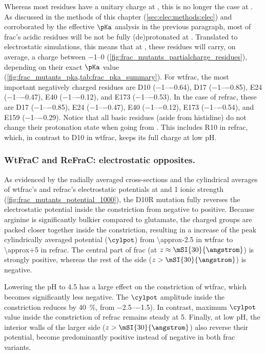 Whereas most residues have a unitary charge at , this is no longer the case at . As discussed
in the methods of this chapter (\cref{sec:elec:methods:elec}) and corroborated by the effective $\pKa$
analysis in the previous paragraph, most of \gls{frac}'s acidic residues will be not be fully (de)protonated
at . Translated to electrostatic simulations, this means that at , these residues will carry,
on average, a charge between \SIrange{-1}{0}{\ec} (\cref{fig:frac_mutants_partialcharge_residues}), depending
on their exact $\pKa$ value (\cref{fig:frac_mutants_pka,tab:frac_pka_summary}). For \gls{wtfrac}, the most
important negatively charged residues are D10 (\SIrange{-1}{-0.64}{\ec}), D17 (\SIrange{-1}{-0.85}{\ec}), E24
(\SIrange{-1}{-0.47}{\ec}), E40 (\SIrange{-1}{-0.12}{\ec}), and E173 (\SIrange{-1}{-0.53}{\ec}). In the case
of \gls{refrac}, these are D17 (\SIrange{-1}{-0.85}{\ec}), E24 (\SIrange{-1}{-0.47}{\ec}), E40
(\SIrange{-1}{-0.12}{\ec}), E173 (\SIrange{-1}{-0.54}{\ec}), and E159 (\SIrange{-1}{-0.29}{\ec}). Notice that
all basic residues (aside from histidine) do not change their protonation state when going from
. This includes R10 in \gls{refrac}, which, in contrast to D10 in \gls{wtfrac}, keeps its
full charge at low pH.

\subsubsection{WtFraC and ReFraC: electrostatic opposites.}
%

As evidenced by the radially averaged cross-sections and the cylindrical averages of \gls{wtfrac}'s and
\gls{refrac}'s electrostatic potentials at  and \SI{1}{\Molar} ionic strength
(\cref{fig:frac_mutants_potential_1000}), the D10R mutation fully reverses the electrostatic potential inside
the constriction from negative to positive. Because arginine is significantly bulkier compared to glutamate,
the charged groups are packed closer together inside the constriction, resulting in a increase of the peak
cylindrically averaged potential ($\cylpot$) from \SI{\approx-2.5}{\kTe} in \gls{wtfrac} to
\SI[retain-explicit-plus]{\approx+5}{\kTe} in \gls{refrac}. The central part of \gls{frac} (at $z \approx
\mSI{30}{\angstrom}$) is strongly positive, whereas the rest of the \cisi{} side ($z > \mSI{30}{\angstrom}$)
is negative.

Lowering the pH to \num{4.5} has a large effect on the constriction of \gls{wtfrac}, which becomes
significantly less negative. The $\cylpot$ amplitude inside the constriction reduces by \SI{40}{\percent},
from \SIrange{-2.5}{-1.5}{\kTe}). In contrast, maximum $\cylpot$ value inside the constriction of \gls{refrac}
remains steady at \SI[retain-explicit-plus]{+5}{\kTe}. Finally, at low pH, the interior walls of the larger
\cisi{} side ($z > \mSI{30}{\angstrom}$) also reverse their potential, become predominantly positive instead
of negative in both \gls{frac} variants.

